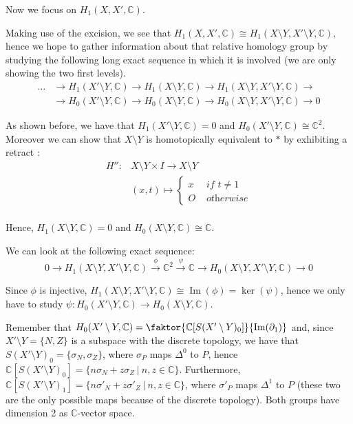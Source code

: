\documentclass{article}
\newcommand{\numberset}{\mathbb}
\newcommand{\C}{\numberset{C}}
\DeclareMathOperator{\Ima}{Im}
\begin{document}
		Now we focus on $H_1(X,X',\C)$.

		Making use of the excision, we see that $H_1(X,X',\C)\cong H_1(X\setminus Y,X'\setminus Y,\C)$, hence we hope to gather information about that relative homology group by studying the following long exact sequence in which it is involved (we are only showing the two first levels).
\begin{align*}
		\ldots & \rightarrow H_{1}(X'\setminus Y,\mathbb{C}) \rightarrow H_{1}(X\setminus Y,\mathbb{C}) \rightarrow H_{1}(X\setminus Y,X'\setminus Y,\mathbb{C}) \rightarrow \\
		& \rightarrow H_{0}(X'\setminus Y,\mathbb{C}) \rightarrow H_{0}(X\setminus Y,\mathbb{C}) \rightarrow H_{0}(X\setminus Y,X'\setminus Y,\mathbb{C}) \rightarrow 0
\end{align*}

As shown before, we have that $H_{1}(X'\setminus Y,\mathbb{C})= 0$ and $H_{0}(X'\setminus Y,\mathbb{C})\cong\mathbb{C}^{2}$. \\
Moreover we can show that $X\setminus Y$ is homotopically equivalent to $*$ by exhibiting a retract : \\
\begin{align*}
		H'': &X\setminus Y\times I\rightarrow X\setminus Y \\
		&(x,t)\mapsto\begin{cases}
				x & \textit{ if } t \neq 1 \\
				O & \textit{ otherwise}
		\end{cases}
\end{align*}
\\

Hence, $H_{1}(X\setminus Y,\mathbb{C})=0$ and $H_{0}(X\setminus Y,\mathbb{C})\cong \mathbb{C}$.

We can look at the following exact sequence:
$$0\rightarrow H_1(X\setminus Y,X'\setminus Y,\C)\xrightarrow{\phi}\C^2\xrightarrow{\psi}\C\rightarrow H_0(X\setminus Y,X'\setminus Y,\C)\rightarrow 0$$

Since $\phi$ is injective, $H_1(X\setminus Y,X'\setminus Y,\C)\cong\Ima(\phi)=\ker(\psi)$, hence we only have to study $\psi:H_0(X'\setminus Y,\C)\rightarrow H_0(X\setminus Y,\C)$.

Remember that $H_0(X'\setminus Y,\C)=\faktor{\C[S(X'\setminus Y)_0]}{\Ima(\partial_1)}$ and, since $X'\setminus Y=\{N,Z\}$ is a subspace with the discrete topology, we have that $S(X'\setminus Y)_0=\{\sigma_N,\sigma_Z\}$, where $\sigma_P$ maps $\Delta^0$ to $P$, hence $\C[S(X'\setminus Y)_0]=\{n\sigma_N+z\sigma_Z\ |\ n,z\in\C\}$. Furthermore, $\C[S(X'\setminus Y)_1]=\{n\sigma'_N+z\sigma'_Z\ |\ n,z\in\C\}$, where $\sigma'_P$ maps $\Delta^1$ to $P$ (these two are the only possible maps because of the discrete topology). Both groups have dimension 2 as $\C$-vector space.
\end{document}
